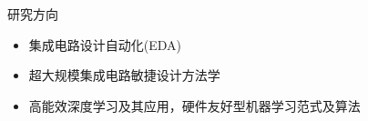 
\begin{rSection}{研究方向}
\begin{itemize}
    \item 集成电路设计自动化(EDA)
    \item 超大规模集成电路敏捷设计方法学
    \item 高能效深度学习及其应用，硬件友好型机器学习范式及算法
\end{itemize}
\end{rSection}

\iffalse
\begin{rSection}{Research Topics}
	\begin{itemize}
		\item Layout Optimization  \\%
		 - Propose a framework to combine layout decomposition and mask optimization into one stage.
		\item Standard Cell Synthesis   \\%
		 - Develop an algorithm of generating standard cell layouts of regular style.
		\item Adder Synthesis  \\%
		 - Propose a machine learning based methodology to search for best performance-area/power trade-off adders.
	\end{itemize}
\end{rSection}
\fi


